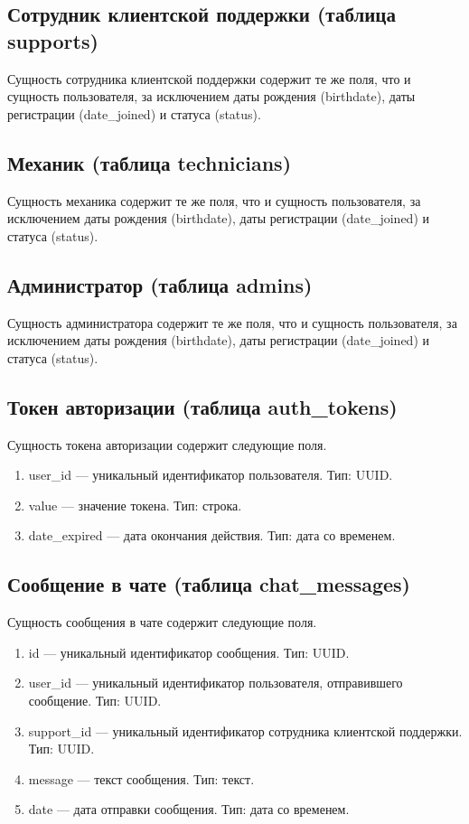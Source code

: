 \subsection{Сотрудник клиентской поддержки (таблица supports)}

Сущность сотрудника клиентской поддержки содержит те же поля, что и сущность пользователя, за исключением даты рождения (birthdate), даты регистрации (date\_joined) и статуса (status).

\subsection{Механик (таблица technicians)}

Сущность механика содержит те же поля, что и сущность пользователя, за исключением даты рождения (birthdate), даты регистрации (date\_joined) и статуса (status).

\subsection{Администратор (таблица admins)}

Сущность администратора содержит те же поля, что и сущность пользователя, за исключением даты рождения (birthdate), даты регистрации (date\_joined) и статуса (status).

\subsection{Токен авторизации (таблица auth\_tokens)}

Сущность токена авторизации содержит следующие поля.

\begin{enumerate}
    \item user\_id --- уникальный идентификатор пользователя. Тип: UUID.
    \item value --- значение токена. Тип: строка.
    \item date\_expired --- дата окончания действия. Тип: дата со временем.
\end{enumerate}

\subsection{Сообщение в чате (таблица chat\_messages)}

Сущность сообщения в чате содержит следующие поля.

\begin{enumerate}
    \item id --- уникальный идентификатор сообщения. Тип: UUID.
    \item user\_id --- уникальный идентификатор пользователя, отправившего сообщение. Тип: UUID.
    \item support\_id --- уникальный идентификатор сотрудника клиентской поддержки. Тип: UUID.
    \item message --- текст сообщения. Тип: текст.
    \item date --- дата отправки сообщения. Тип: дата со временем.
\end{enumerate}

